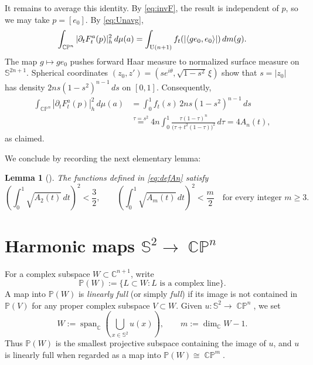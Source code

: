 \documentclass[11pt]{article}
\theoremstyle{plain}
\numberwithin{equation}{section}
\newtheorem{lemma}[theorem]{Lemma}
\theoremstyle{definition}
\let\oldendproof\endproof
\renewenvironment{proof}[1][\proofname]{%
\oldproof[\upshape \bfseries #1]%
}{\oldendproof}
\def \C{\mathbb{C}}
\def \mb{\mathbb}
\def \tp{\textup}
\DeclareMathOperator{\CP}{\mathbb{CP}}
\begin{document}
\begin{proof}
It remains to average this identity.  By \eqref{eq:invF}, the result is
independent of $p$, so we may take $p=[e_0]$.  By \eqref{eq:Unavg},
\[
    \int_{\CP^n}|\partial_tF_t^a(p)|_h^2\,d\mu(a)
    =\int_{\tp{U}(n+1)}
      f_t(|\langle ge_0,e_0\rangle|)\,dm(g).
\]
The map $g\mapsto ge_0$ pushes forward Haar measure to normalized surface
measure on $\mb S^{2n+1}$.  Spherical coordinates
$(z_0,z')=(se^{i\theta},\sqrt{1-s^2}\,\xi)$ show that $s=|z_0|$ has density
$2ns(1-s^2)^{n-1}\,ds$ on $[0,1]$.  Consequently,
\[
\begin{aligned}
    \int_{\CP^n}|\partial_tF_t^a(p)|_h^2\,d\mu(a)
    &=\int_0^1f_t(s)\,2n s(1-s^2)^{n-1}\,ds\\
    &\overset{\tau=s^2}{=}
      4n\int_0^1
      \frac{\tau(1-\tau)^n}
      {\bigl(\tau+t^2(1-\tau)\bigr)^2}\,d\tau
    =4A_n(t),
\end{aligned}
\]
as claimed.
\end{proof}

We conclude by recording the next elementary lemma:

\begin{lemma}[\cite{Fujioka1993}]
    \label{lem:AmIntegralEstimate}
The functions defined in \eqref{eq:defAn} satisfy
\[
    \left(\int_0^1\sqrt{A_2(t)}\,dt\right)^2<\frac32,
    \qquad
    \left(\int_0^1\sqrt{A_m(t)}\,dt\right)^2<\frac m2
    \quad\text{for every integer }m\geq3.
\]
\end{lemma}



\section{Harmonic maps \texorpdfstring{$\mb S^2\to \CP^n$}{S2 to CPn}}\label{sec:S2toCPn}

For a complex subspace $W\subset\C^{n+1}$, write
\[
    \mb P(W):=\{L\subset W:L\text{ is a complex line}\}.
\]
A map into $\mb P(W)$ is \emph{linearly full} (or simply \emph{full}) if
its image is not contained in $\mb P(V)$ for any proper complex subspace
$V\subset W$.  Given $u\colon\mb S^2\to\CP^n$, we set
\begin{equation}
    \label{eq:projectiveSpanDimension}
    W:=\operatorname{span}_{\C}
       \left(\bigcup_{x\in\mb S^2}u(x)\right),
    \qquad
    m:=\dim_{\C}W-1.
\end{equation}
Thus $\mb P(W)$ is the smallest projective subspace containing the image of
$u$, and $u$ is linearly full when regarded as a map into
$\mb P(W)\cong\CP^m$.
\end{document}
